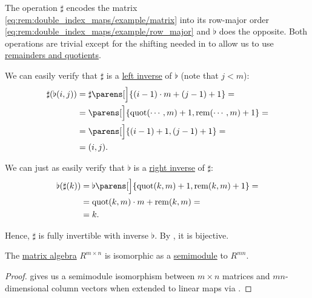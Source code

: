 \begin{remark}
  The operation \( \sharp \) encodes the matrix \eqref{eq:rem:double_index_maps/example/matrix} into its row-major order \eqref{eq:rem:double_index_maps/example/row_major} and \( \flat \) does the opposite. Both operations are trivial except for the shifting needed in to allow us to use \hyperref[def:euclidean_domain]{remainders and quotients}.

  We can easily verify that \( \sharp \) is a \hyperref[def:morphism_invertibility/left_invertible]{left inverse} of \( \flat \) (note that \( j < m \)):
  \begin{align*}
    \sharp(\flat(i, j))
    &=
    \sharp\parens[\Big]{ (i - 1) \cdot m + (j - 1) + 1 }
    = \\ &=
    \parens[\Big]{ \quot(\cdots, m) + 1, \rem(\cdots, m) + 1 }
    = \\ &=
    \parens[\Big]{ (i - 1) + 1, (j - 1) + 1 }
    = \\ &=
    (i, j).
  \end{align*}

  We can just as easily verify that \( \flat \) is a \hyperref[def:morphism_invertibility/right_invertible]{right inverse} of \( \sharp \):
  \begin{align*}
    \flat(\sharp(k))
    &=
    \flat\parens[\Big]{ \quot(k, m) + 1, \rem(k, m) + 1 }
    = \\ &=
    \quot(k, m) \cdot m + \rem(k, m)
    = \\ &=
    k.
  \end{align*}

  Hence, \( \sharp \) is fully invertible with inverse \( \flat \). By , it is bijective.
\end{remark}

\begin{proposition}\label{thm:matrix_spaces_are_free_modules}
  The \hyperref[thm:matrix_algebra]{matrix algebra} \( R^{m \times n} \) is isomorphic as a \hyperref[def:semimodule]{semimodule} to \( R^{mn} \).
\end{proposition}
\begin{proof}
   gives us a semimodule isomorphism between \( m \times n \) matrices and \( mn \)-dimensional column vectors when extended to linear maps via .
\end{proof}

